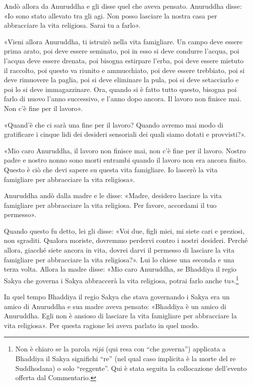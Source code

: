 Andò allora da Anuruddha e gli disse quel che aveva pensato. Anuruddha
disse: «Io sono stato allevato tra gli agi. Non posso lasciare la nostra
casa per abbracciare la vita religiosa. Sarai tu a farlo».


«Vieni allora Anuruddha, ti istruirò nella vita famigliare. Un campo
deve essere prima arato, poi deve essere seminato, poi in esso si deve
condurre l’acqua, poi l’acqua deve essere drenata, poi bisogna estirpare
l’erba, poi deve essere mietuto il raccolto, poi questo va riunito e
ammucchiato, poi deve essere trebbiato, poi si deve rimuovere la paglia,
poi si deve eliminare la pula, poi si deve setacciarlo e poi lo si deve
immagazzinare. Ora, quando si è fatto tutto questo, bisogna poi farlo di
nuovo l’anno successivo, e l’anno dopo ancora. Il lavoro non finisce
mai. Non c’è fine per il lavoro».


«Quand’è che ci sarà una fine per il lavoro? Quando avremo mai modo di
gratificare i cinque lidi dei desideri sensoriali dei quali siamo dotati
e provvisti?».


«Mio caro Anuruddha, il lavoro non finisce mai, non c’è fine per il
lavoro. Nostro padre e nostro nonno sono morti entrambi quando il lavoro
non era ancora finito. Questo è ciò che devi sapere su questa vita
famigliare. Io lascerò la vita famigliare per abbracciare la vita
religiosa».


Anuruddha andò dalla madre e le disse: «Madre, desidero lasciare la vita
famigliare per abbracciare la vita religiosa. Per favore, accordami il
tuo permesso».


Quando questo fu detto, lei gli disse: «Voi due, figli miei, mi siete
cari e preziosi, non sgraditi. Qualora moriste, dovremmo perdervi contro
i nostri desideri. Perché allora, giacché siete ancora in vita, dovrei
darvi il permesso di lasciare la vita famigliare per abbracciare la vita
religiosa?». Lui lo chiese una seconda e una terza volta. Allora la
madre disse: «Mio caro Anuruddha, se Bhaddiya il regio Sakya che governa
i Sakya abbraccerà la vita religiosa, potrai farlo anche
tu».\footnote{Non è chiaro se la parola \emph{rājā} (qui resa con “che governa”) applicata a Bhaddiya il Sakya significhi “re” (nel qual caso implicita è la morte del re Suddhodana) o solo “reggente”. Qui è stata seguita la collocazione dell’evento offerta dal Commentario.}


In quel tempo Bhaddiya il regio Sakya che stava governando i Sakya era
un amico di Anuruddha e sua madre aveva pensato: «Bhaddiya è un amico di
Anuruddha. Egli non è ansioso di lasciare la vita famigliare per
abbracciare la vita religiosa». Per questa ragione lei aveva parlato in
quel modo.


